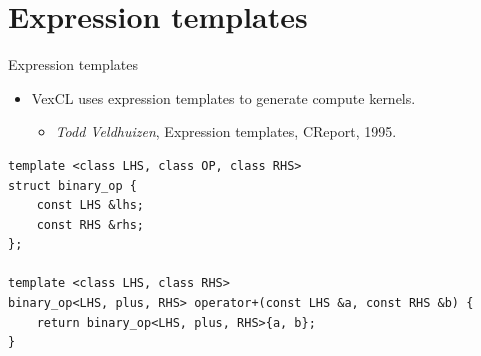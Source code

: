 \documentclass[@BEAMER_OPTIONS@]{beamer}
\newcommand{\CXX}{{\rm C}\plusplus}
\begin{document}
\section{Expression templates}

\begin{frame}[fragile]{Expression templates}
    \begin{itemize}
        \item VexCL uses expression templates to generate compute kernels.
            \begin{itemize}
                \item \emph{Todd Veldhuizen}, Expression templates, \CXX Report, 1995.
            \end{itemize}
    \end{itemize}
    \begin{exampleblock}{}
        \begin{lstlisting}
template <class LHS, class OP, class RHS>
struct binary_op {
    const LHS &lhs;
    const RHS &rhs;
};

template <class LHS, class RHS>
binary_op<LHS, plus, RHS> operator+(const LHS &a, const RHS &b) {
    return binary_op<LHS, plus, RHS>{a, b};
}
        \end{lstlisting}
    \end{exampleblock}
\end{frame}
\end{document}
